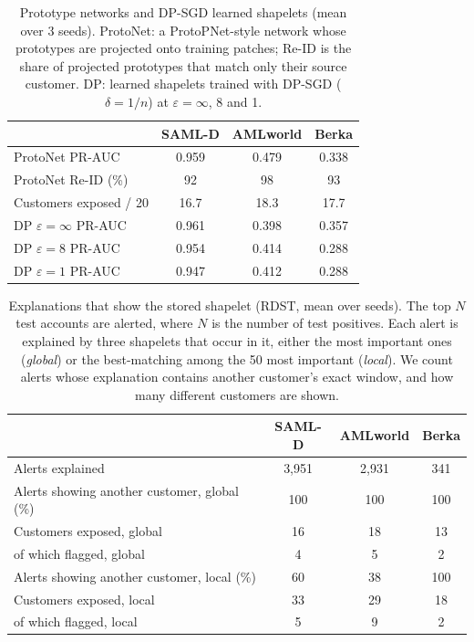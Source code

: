 \begin{table}[t]
\caption{Prototype networks and DP-SGD learned shapelets (mean over 3 seeds). ProtoNet: a ProtoPNet-style network whose prototypes are projected onto training patches; Re-ID is the share of projected prototypes that match only their source customer. DP: learned shapelets trained with DP-SGD ($\delta = 1/n$) at $\varepsilon = \infty$, 8 and 1.}
\label{tab:proto}
\small\setlength{\tabcolsep}{2.5pt}
\centering
\begin{tabular}{lccc}
\toprule
& SAML-D & AMLworld & Berka \\
\midrule
ProtoNet PR-AUC & 0.959 & 0.479 & 0.338 \\
ProtoNet Re-ID (\%) & 92 & 98 & 93 \\
Customers exposed / 20 & 16.7 & 18.3 & 17.7 \\
\midrule
DP $\varepsilon=\infty$ PR-AUC & 0.961 & 0.398 & 0.357 \\
DP $\varepsilon=8$ PR-AUC & 0.954 & 0.414 & 0.288 \\
DP $\varepsilon=1$ PR-AUC & 0.947 & 0.412 & 0.288 \\
\bottomrule\end{tabular}\end{table}
\begin{table}[t]
\caption{Explanations that show the stored shapelet (RDST, mean over seeds). The top $N$ test accounts are alerted, where $N$ is the number of test positives. Each alert is explained by three shapelets that occur in it, either the most important ones (\emph{global}) or the best-matching among the 50 most important (\emph{local}). We count alerts whose explanation contains another customer's exact window, and how many different customers are shown.}
\label{tab:expl}
\small\setlength{\tabcolsep}{2.5pt}
\centering
\begin{tabular}{lccc}
\toprule
& SAML-D & AMLworld & Berka \\
\midrule
Alerts explained & 3,951 & 2,931 & 341 \\
Alerts showing another customer, global (\%) & 100 & 100 & 100 \\
Customers exposed, global & 16 & 18 & 13 \\
\quad of which flagged, global & 4 & 5 & 2 \\
Alerts showing another customer, local (\%) & 60 & 38 & 100 \\
Customers exposed, local & 33 & 29 & 18 \\
\quad of which flagged, local & 5 & 9 & 2 \\
\bottomrule\end{tabular}\end{table}
